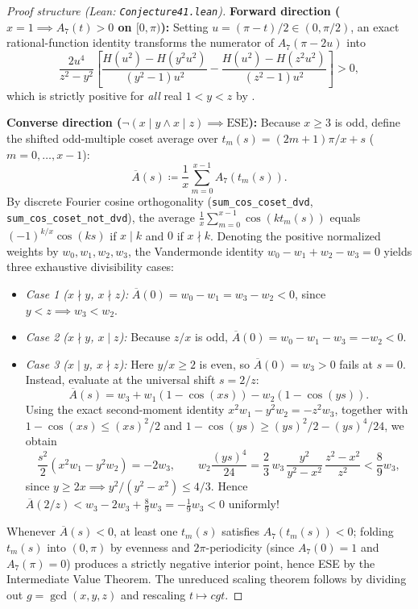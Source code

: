 \documentclass[11pt,reqno]{amsart}
\theoremstyle{definition}
\newcommand{\id}[1]{\textnormal{\texttt{\small #1}}}
\newcommand{\idb}[1]{\textnormal{\texttt{\footnotesize #1}}}
\newcommand{\ub}{\_\allowbreak}
\begin{document}
\begin{proof}[Proof structure (Lean: \id{Conjecture41.lean})]
\textbf{Forward direction ($x=1 \implies A_7(t)>0$ on $[0,\pi)$):} Setting $u=(\pi-t)/2\in(0,\pi/2)$, an exact rational-function identity transforms the numerator of $A_7(\pi-2u)$ into
\[
\frac{2u^4}{z^2-y^2}\left[\frac{H(u^2)-H(y^2u^2)}{(y^2-1)u^2} - \frac{H(u^2)-H(z^2u^2)}{(z^2-1)u^2}\right] > 0,
\]
which is strictly positive for \emph{all} real $1<y<z$ by .

\textbf{Converse direction ($\neg(x\mid y\wedge x\mid z) \implies \mathrm{ESE}$):} Because $x\ge 3$ is odd, define the shifted odd-multiple coset average over $t_m(s)=(2m+1)\pi/x + s$ ($m=0,\dots,x-1$):
\[
\overline{A}(s) \coloneqq \frac{1}{x}\sum_{m=0}^{x-1} A_7(t_m(s)).
\]
By discrete Fourier cosine orthogonality (\idb{sum\ub cos\ub coset\ub dvd}, \idb{sum\ub cos\ub coset\ub not\ub dvd}), the average $\frac{1}{x}\sum_{m=0}^{x-1}\cos(k t_m(s))$ equals $(-1)^{k/x}\cos(ks)$ if $x\mid k$ and $0$ if $x\nmid k$. Denoting the positive normalized weights by $w_0,w_1,w_2,w_3$, the Vandermonde identity $w_0-w_1+w_2-w_3=0$ yields three exhaustive divisibility cases:
\begin{itemize}
\item \emph{Case 1 ($x\nmid y$, $x\nmid z$):} $\overline{A}(0) = w_0 - w_1 = w_3 - w_2 < 0$, since $y<z\implies w_3<w_2$.
\item \emph{Case 2 ($x\nmid y$, $x\mid z$):} Because $z/x$ is odd, $\overline{A}(0) = w_0 - w_1 - w_3 = -w_2 < 0$.
\item \emph{Case 3 ($x\mid y$, $x\nmid z$):} Here $y/x\ge 2$ is even, so $\overline{A}(0)=w_3>0$ fails at $s=0$. Instead, evaluate at the universal shift $s=2/z$:
\[
\overline{A}(s) = w_3 + w_1(1-\cos(xs)) - w_2(1-\cos(ys)).
\]
Using the exact second-moment identity $x^2 w_1 - y^2 w_2 = -z^2 w_3$, together with $1-\cos(xs)\le (xs)^2/2$ and $1-\cos(ys)\ge (ys)^2/2 - (ys)^4/24$, we obtain
\[
\frac{s^2}{2}(x^2 w_1 - y^2 w_2) = -2w_3, \qquad
w_2\frac{(ys)^4}{24} = \frac{2}{3}\,w_3\,\frac{y^2}{y^2-x^2}\,\frac{z^2-x^2}{z^2} < \frac{8}{9}w_3,
\]
since $y\ge 2x\implies y^2/(y^2-x^2)\le 4/3$. Hence $\overline{A}(2/z) < w_3 - 2w_3 + \tfrac{8}{9}w_3 = -\tfrac{1}{9}w_3 < 0$ uniformly!
\end{itemize}
Whenever $\overline{A}(s)<0$, at least one $t_m(s)$ satisfies $A_7(t_m(s))<0$; folding $t_m(s)$ into $(0,\pi)$ by evenness and $2\pi$-periodicity (since $A_7(0)=1$ and $A_7(\pi)=0$) produces a strictly negative interior point, hence ESE by the Intermediate Value Theorem. The unreduced scaling theorem follows by dividing out $g=\gcd(x,y,z)$ and rescaling $t\mapsto cgt$.
\end{proof}
\end{document}
